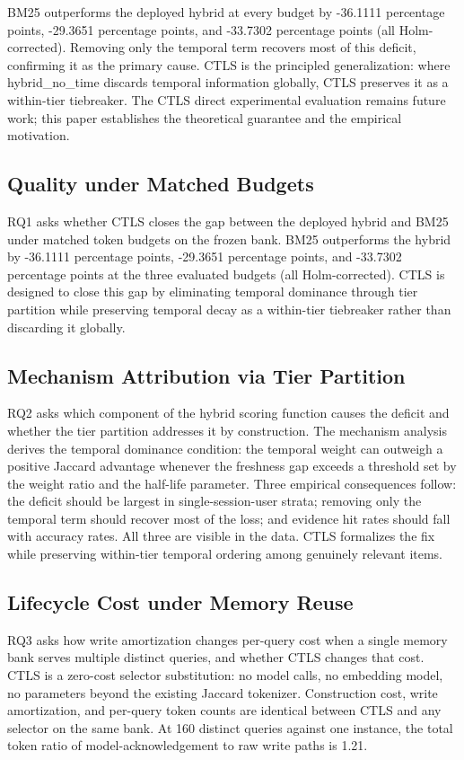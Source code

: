 BM25 outperforms the deployed hybrid at every budget by -36.1111 percentage points, -29.3651 percentage points, and -33.7302 percentage points (all Holm-corrected). Removing only the temporal term recovers most of this deficit, confirming it as the primary cause. CTLS is the principled generalization: where hybrid\_no\_time discards temporal information globally, CTLS preserves it as a within-tier tiebreaker. The CTLS direct experimental evaluation remains future work; this paper establishes the theoretical guarantee and the empirical motivation.

\subsection{Quality under Matched Budgets}

\label{sec:rq_quality}

RQ1 asks whether CTLS closes the gap between the deployed hybrid and BM25 under matched token budgets on the frozen bank. BM25 outperforms the hybrid by -36.1111 percentage points, -29.3651 percentage points, and -33.7302 percentage points at the three evaluated budgets (all Holm-corrected). CTLS is designed to close this gap by eliminating temporal dominance through tier partition while preserving temporal decay as a within-tier tiebreaker rather than discarding it globally.

\subsection{Mechanism Attribution via Tier Partition}

\label{sec:rq_attribution}

RQ2 asks which component of the hybrid scoring function causes the deficit and whether the tier partition addresses it by construction. The mechanism analysis derives the temporal dominance condition: the temporal weight can outweigh a positive Jaccard advantage whenever the freshness gap exceeds a threshold set by the weight ratio and the half-life parameter. Three empirical consequences follow: the deficit should be largest in single-session-user strata; removing only the temporal term should recover most of the loss; and evidence hit rates should fall with accuracy rates. All three are visible in the data. CTLS formalizes the fix while preserving within-tier temporal ordering among genuinely relevant items.

\subsection{Lifecycle Cost under Memory Reuse}

\label{sec:rq_lifecycle}

RQ3 asks how write amortization changes per-query cost when a single memory bank serves multiple distinct queries, and whether CTLS changes that cost. CTLS is a zero-cost selector substitution: no model calls, no embedding model, no parameters beyond the existing Jaccard tokenizer. Construction cost, write amortization, and per-query token counts are identical between CTLS and any selector on the same bank. At 160 distinct queries against one instance, the total token ratio of model-acknowledgement to raw write paths is 1.21.
